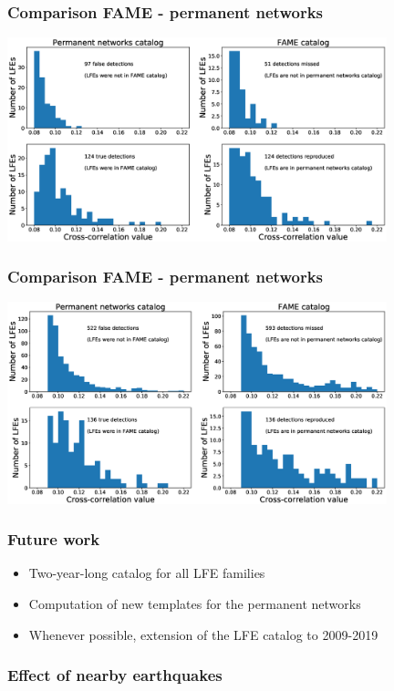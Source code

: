 \documentclass{beamer}
\begin{document}
	\begin{frame}
		\frametitle{Comparison FAME - permanent networks}
		\begin{center}
			\includegraphics[width=11cm, trim={0cm 0cm 0cm 0cm}, clip]{other/Figure3.eps}
		\end{center}
	\end{frame}

	\begin{frame}
		\frametitle{Comparison FAME - permanent networks}
		\begin{center}
			\includegraphics[width=11cm, trim={0cm 0cm 0cm 0cm}, clip]{other/Figure4.eps}
		\end{center}
	\end{frame}

	\begin{frame}
		\frametitle{Future work}
		\begin{itemize}
			\item Two-year-long catalog for all LFE families
			\item Computation of new templates for the permanent networks
			\item Whenever possible, extension of the LFE catalog to 2009-2019
		\end{itemize}
	\end{frame}

	\begin{frame}
		\frametitle{Effect of nearby earthquakes}
	\end{frame}
\end{document}
